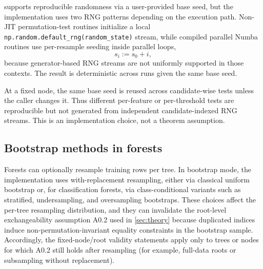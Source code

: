 \citrees supports reproducible randomness via a user-provided base seed, but the
implementation uses two RNG patterns depending on the execution path.
Non-JIT permutation-test routines initialize a local
\texttt{np.random.default\_rng(random\_state)} stream, while compiled parallel
Numba routines use per-resample seeding inside parallel loops,
%
\begin{equation}
  s_i := s_0 + i,
\end{equation}
%
because generator-based RNG streams are not uniformly supported in those
contexts. The result is deterministic across runs given the same base seed.

At a fixed node, the same base seed is reused across candidate-wise tests
unless the caller changes it. Thus different per-feature or per-threshold tests
are reproducible but not generated from independent candidate-indexed RNG
streams. This is an implementation choice, not a theorem assumption.

\subsection{Bootstrap methods in forests}

Forests can optionally resample training rows per tree. In bootstrap mode, the
implementation uses with-replacement resampling, either via classical uniform
bootstrap or, for classification forests, via class-conditional variants such
as stratified, undersampling, and oversampling bootstraps. These choices affect
the per-tree resampling distribution, and they can invalidate the root-level
exchangeability assumption A0.2 used in \cref{sec:theory} because duplicated
indices induce non-permutation-invariant equality constraints in the bootstrap
sample.
Accordingly, the fixed-node/root validity statements apply only to trees or
nodes for which A0.2 still holds after resampling (for example, full-data roots
or subsampling without replacement).
